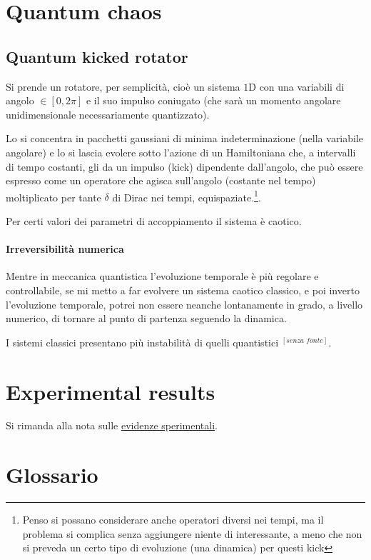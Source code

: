 \documentclass[a4paper,10pt]{article}
\begin{document}
\section{Quantum chaos}

\subsection{Quantum kicked rotator} Si prende un rotatore, per semplicità, cioè un sistema $1$D con una variabili di angolo $\in [0,2\pi]$ e il suo impulso coniugato (che sarà un momento angolare unidimensionale necessariamente quantizzato).

Lo si concentra in pacchetti gaussiani di minima indeterminazione (nella variabile angolare) e lo si lascia evolere sotto l'azione di un Hamiltoniana che, a intervalli di tempo costanti, gli da un impulso (kick) dipendente dall'angolo, che può essere espresso come un operatore che agisca sull'angolo (costante nel tempo) moltiplicato per tante $\delta$ di Dirac nei tempi, equispaziate.\footnote{Penso si possano considerare anche operatori diversi nei tempi, ma il problema si complica senza aggiungere niente di interessante, a meno che non si preveda un certo tipo di evoluzione (una dinamica) per questi kick}.

Per certi valori dei parametri di accoppiamento il sistema è caotico.

\paragraph{Irreversibilità numerica} Mentre in meccanica quantistica l'evoluzione temporale è più regolare e controllabile, se mi metto a far evolvere un sistema caotico classico, e poi inverto l'evoluzione temporale, potrei non essere neanche lontanamente in grado, a livello numerico, di tornare al punto di partenza seguendo la dinamica.

I sistemi classici presentano più instabilità di quelli quantistici $^{[\textit{senza fonte}]}$.

\section{Experimental results}

Si rimanda alla nota sulle \href{./ExperimentalEvidences.pdf}{evidenze sperimentali}.

\section{Glossario}
\end{document}
